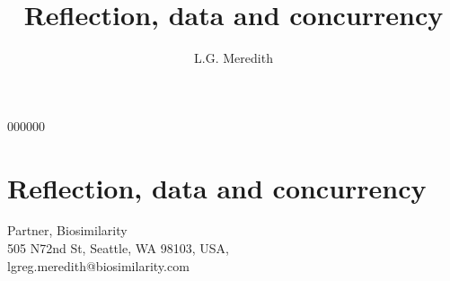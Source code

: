 \begin{symbollist}{000000}
\end{symbollist}

\tableofcontents
\listoftables
\listoffigures
\part{Reflection, data and concurrency}

\title{Reflection, data and concurrency}




\author{ L.G. Meredith }{ Partner, Biosimilarity\\ 505 N72nd St, Seattle, WA 98103, USA, \\ lgreg.meredith@biosimilarity.com }





